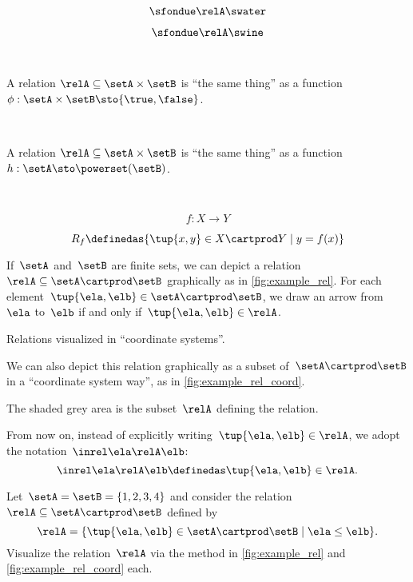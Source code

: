 {\begin{forslides}
		$$ \sfondue \relA \swater \label{eq:slides-17}$$

		$$ \sfondue \relA \swine \label{eq:slides-18}$$

        \
        
        A relation $\relA \subseteq \setA \times \setB$ is ``the same thing'' as a function $\phi : \setA \times \setB \sto \{\true, \false\}$.
        
        \
        
        
        A relation $\relA \subseteq \setA \times \setB$ is ``the same thing'' as a function $h : \setA  \sto \powerset (\setB)$.
        
        \

		$$
			f : X \to Y
		$$

		$$
			R_f \definedas \{ \tup{x, y} \in X \cartprod Y \mid y = f(x) \}
		$$

	\end{forslides}
}

If~$\setA$ and~$\setB$ are finite sets, we can depict a relation~$\relA \subseteq \setA \cartprod \setB$ graphically as in \cref{fig:example_rel}.
For each element~$\tup{\ela,\elb} \in \setA \cartprod \setB$, we draw an arrow from~$\ela$ to~$\elb$ if and only if~$\tup{\ela,\elb} \in \relA$.

\begin{marginfigure}
	\centering
	\caption{Relations visualized in ``coordinate systems''.}
	\label{fig:example_rel_coord}
\end{marginfigure}

We can also depict this relation graphically as a subset of~$\setA \cartprod \setB$ in a ``coordinate system way'', as in \cref{fig:example_rel_coord}.

The shaded grey area is the subset~$\relA$ defining the relation.

\begin{remark}
	From now on, instead of explicitly writing~$\tup{\ela,\elb}\in \relA$, we adopt the notation~$\inrel \ela \relA \elb$:
	\begin{equation}
		\inrel \ela \relA \elb \definedas \tup{\ela,\elb}\in \relA.
	\end{equation}
\end{remark}

\vfill
\begin{gradedexercise}
    \label{ex:visualize-leq-relation}
    Let~$\setA = \setB = \{1, 2, 3, 4 \}$ and consider the relation~$\relA \subseteq \setA \cartprod \setB$ defined by
    \begin{equation}
        \relA = \{ \tup{\ela,\elb} \in \setA \cartprod \setB \mid \ela \leq \elb \}.
    \end{equation}
    Visualize the relation~$\relA$ via the method in \cref{fig:example_rel} and \cref{fig:example_rel_coord} each.
\end{gradedexercise}

